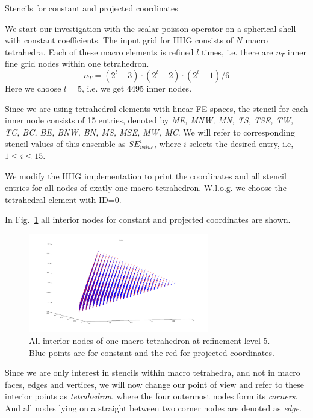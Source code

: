 \documentclass[a4paper,11pt,reqno]{amsart}
\numberwithin{figure}{section}
\numberwithin{table}{section}
\numberwithin{figure}{subsection}
\def\si{SE_{value}^i}
\begin{document}
\begin{section}{Stencils for constant and projected coordinates}

We start our investigation with the scalar poisson operator on a spherical
shell with constant coefficients. 
The input grid for HHG consists of $N$ macro tetrahedra. Each of these
macro elements is refined $l$ times, i.e. there are $n_T$ inner fine grid nodes
within one tetrahedron.
\begin{equation}
n_T = \left(2^l - 3\right)\cdot\left(2^l - 2\right)\cdot\left(2^l - 1\right)/6
\end{equation}
Here we choose $l=5$, i.e. we get 4495 inner nodes.

Since we are using tetrahedral elements with linear FE spaces, the stencil
for each inner node consists of 15 entries,  denoted by
\emph{ME, MNW, MN, TS, TSE, TW, TC, BC, BE, BNW, BN, MS, MSE, MW, MC}.
We will refer to corresponding stencil values of this ensemble as 
$\si$, where $i$ selects the desired
entry, i.e, $1 \leq i \leq 15$.

We modify the HHG implementation to print the coordinates and all stencil entries
for all nodes of exatly one macro tetrahedron. W.l.o.g. we choose the tetrahedral
element with ID=0.

In Fig.~\ref{fig:tet0Nodes} all interior nodes for constant and projected coordinates
are shown.

\begin{figure}\centering
\includegraphics[width=0.7\textwidth]{pics/tetInnerNodes} 
\caption{All interior nodes of one macro tetrahedron at refinement level 5.
Blue points are for constant and the red for projected coordinates.}
\label{fig:tet0Nodes}
\end{figure}   

Since we are only interest in stencils within macro tetrahedra, and not in macro faces,
edges and vertices, we will now change our point of view and refer to these interior points
as \emph{tetrahedron}, where the four outermost nodes form its \emph{corners}. 
And all nodes lying on a straight between two corner nodes are denoted as \emph{edge}.



\end{section}
\end{document}
